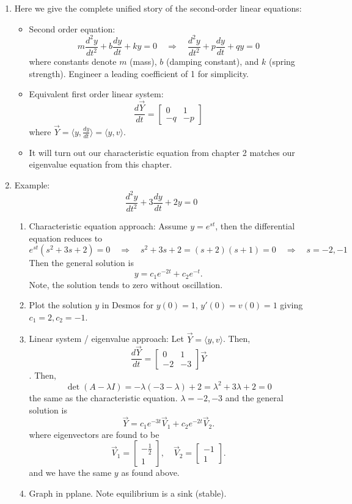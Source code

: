 \documentclass{article}
\begin{document}
\begin{enumerate}

\item Here we give the complete unified story of the second-order linear equations:
\begin{itemize}
\item Second order equation:
\[
m \frac{d^2 y}{dt^2} + b \frac{dy}{dt} + ky = 0 \quad \Rightarrow \quad 
\frac{d^2 y}{dt^2} + p \frac{dy}{dt} + qy = 0 
\]
where constants denote $m$ (mass), $b$ (damping constant), and $k$ (spring strength). Engineer a leading coefficient of 1 for simplicity.
\item Equivalent first order linear system:
\[
\frac{d \vec{Y}}{dt} = 
\begin{bmatrix}
0 & 1 \\
-q & -p
\end{bmatrix}
\] 
where $\vec{Y} = \langle y,\frac{dy}{dt} \rangle  = \langle y,v \rangle$.
\item It will turn out our characteristic equation from chapter 2 matches our eigenvalue equation from this chapter.
\end{itemize}


\item Example:
\[
\frac{d^2 y}{dt^2} + 3\frac{dy}{dt} + 2y = 0
\]
\begin{enumerate}
\item Characteristic equation approach: Assume $y = e^{st}$, then the differential equation reduces to
\[
e^{st}(s^2+3s+2)=0 \quad \Rightarrow \quad s^2+3s+2=(s+2)(s+1)=0 \quad \Rightarrow \quad s=-2, -1
\]
Then the general solution is
\[
y = c_1 e^{-2t} + c_2 e^{-t}. 
\]
Note, the solution tends to zero without oscillation.
\item Plot the solution $y$ in Desmos for $y(0)=1$, $y'(0)=v(0)=1$ giving $c_1=2, c_2=-1$.
\item Linear system / eigenvalue approach: Let $\vec{Y} = \langle y, v \rangle$. Then,
\[
\frac{d \vec{Y}}{dt} = \begin{bmatrix}
0 & 1 \\
-2 & -3
\end{bmatrix} \vec{Y}
\].
Then,
\[
\det(A-\lambda I) = -\lambda(-3-\lambda)+2 = \lambda^2+3\lambda+2=0
\]
the same as the characteristic equation. $\lambda = -2,-3$ and the general solution is
\[
\vec{Y} = c_1 e^{-3t} \vec{V}_1+ c_2 e^{-2t} \vec{V}_2.
\]
where eigenvectors are found to be
\[
\vec{V}_1 = 
\begin{bmatrix}
-\frac{1}{2} \\1
\end{bmatrix}, \quad
\vec{V}_2 = 
\begin{bmatrix}
-1 \\1
\end{bmatrix}.
\] and we have the same $y$ as found above.
\item Graph in pplane. Note equilibrium is a sink (stable).
\end{enumerate}



\end{enumerate}
\end{document}
